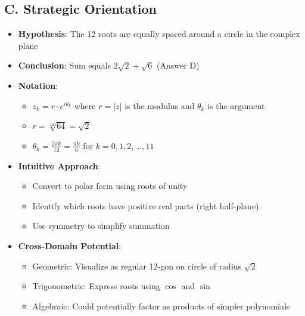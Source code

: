 \documentclass[11pt]{article}
\begin{document}
\begin{problemconfigbox}
\subsection*{C. Strategic Orientation}
\begin{itemize}[leftmargin=*]
    \item \textbf{Hypothesis}: The 12 roots are equally spaced around a circle in the complex plane
    \item \textbf{Conclusion}: Sum equals $2\sqrt{2}+\sqrt{6}$ (Answer D)
    \item \textbf{Notation}: 
    \begin{itemize}
        \item $z_k = r \cdot e^{i\theta_k}$ where $r = |z|$ is the modulus and $\theta_k$ is the argument
        \item $r = \sqrt[12]{64} = \sqrt{2}$
        \item $\theta_k = \frac{2\pi k}{12} = \frac{\pi k}{6}$ for $k = 0, 1, 2, \ldots, 11$
    \end{itemize}
    \item \textbf{Intuitive Approach}: 
    \begin{itemize}
        \item Convert to polar form using roots of unity
        \item Identify which roots have positive real parts (right half-plane)
        \item Use symmetry to simplify summation
    \end{itemize}
    \item \textbf{Cross-Domain Potential}: 
    \begin{itemize}
        \item Geometric: Visualize as regular 12-gon on circle of radius $\sqrt{2}$
        \item Trigonometric: Express roots using $\cos$ and $\sin$
        \item Algebraic: Could potentially factor as products of simpler polynomials
    \end{itemize}
\end{itemize}
\end{problemconfigbox}
\end{document}

